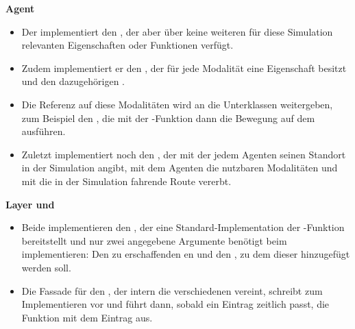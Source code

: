 \textbf{Agent }
\begin{itemize}
    \item Der  implementiert den , der aber über keine weiteren für diese Simulation relevanten Eigenschaften oder Funktionen verfügt.
    \item Zudem implementiert er den , der für jede Modalität eine Eigenschaft besitzt und den dazugehörigen .
    \item Die Referenz auf diese Modalitäten wird an die Unterklassen weitergeben, zum Beispiel den , die mit der -Funktion dann die Bewegung auf dem  ausführen.
    \item Zuletzt implementiert  noch den , der mit der  jedem Agenten seinen Standort in der Simulation angibt, mit  dem Agenten die nutzbaren Modalitäten und mit  die in der Simulation fahrende Route vererbt.
\end{itemize}

\textbf{Layer  und }
\begin{itemize}
    \item Beide  implementieren den , der eine Standard-Implementation der -Funktion bereitstellt und nur zwei angegebene Argumente benötigt beim implementieren: Den zu erschaffenden en und den , zu dem dieser hinzugefügt werden soll.
    \item Die Fassade für den , der intern die verschiedenen  vereint, schreibt  zum Implementieren vor und führt dann, sobald ein Eintrag zeitlich passt, die Funktion mit dem Eintrag aus.
\end{itemize}

